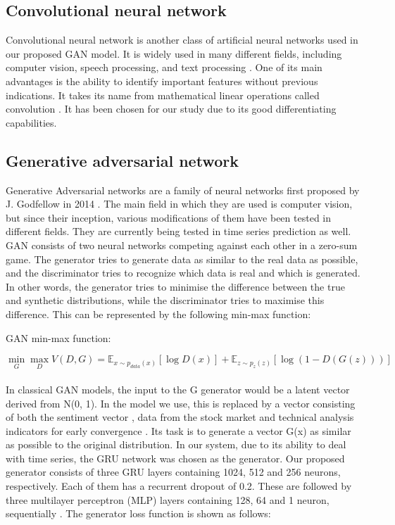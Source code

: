 \documentclass[11pt]{article} %
\begin{document}
\subsection{Convolutional neural network}

Convolutional neural network is another class of artificial neural networks used in our proposed GAN model. It is widely used in many different fields, including computer vision, speech processing, and text processing \cite{cnn1}. One of its main advantages is the ability to identify important features without previous indications. It takes its name from mathematical linear operations called convolution \cite{cnn2}. It has been chosen for our study due to its good differentiating capabilities.

\subsection{Generative adversarial network}

Generative Adversarial networks are a family of neural networks first proposed by J. Godfellow in 2014 \cite{gan1}. The main field in which they are used is computer vision, but since their inception, various modifications of them have been tested in different fields. They are currently being tested in time series prediction as well.  GAN consists of two neural networks competing against each other in a zero-sum game. The generator tries to generate data as similar to the real data as possible, and the discriminator tries to recognize which data is real and which is generated. In other words, the generator tries to minimise the difference between the true and synthetic distributions, while the discriminator tries to maximise this difference. This can be represented by the following min-max function: 


\begin{center}   GAN min-max function: \end{center}
\begin{equation} \min_G \max_D V(D, G)=
\mathbb{E}_{x\sim p_{data}(x)}[\log D(x)]
+ \mathbb{E}_{z\sim p_z(z)}[\log(1 - D(G(z)))] \end{equation}\\

In classical GAN models, the input to the G generator would be a latent vector derived from N(0, 1). In the model we use, this is replaced by a vector consisting of both the sentiment vector \cite{gan-stock}, data from the stock market and technical analysis indicators for early convergence \cite{gan-stock2}. Its task is to generate a vector G(x) as similar as possible to the original distribution. In our system, due to its ability to deal with time series, the GRU network was chosen as the generator. Our proposed generator consists of three GRU layers containing 1024, 512 and 256 neurons, respectively. Each of them has a recurrent dropout of 0.2. These are followed by three multilayer perceptron (MLP) layers containing 128, 64 and 1 neuron, sequentially \cite{gan-stock}\cite{gan-stock2}. 
The generator loss function is shown as follows: 
\end{document}
